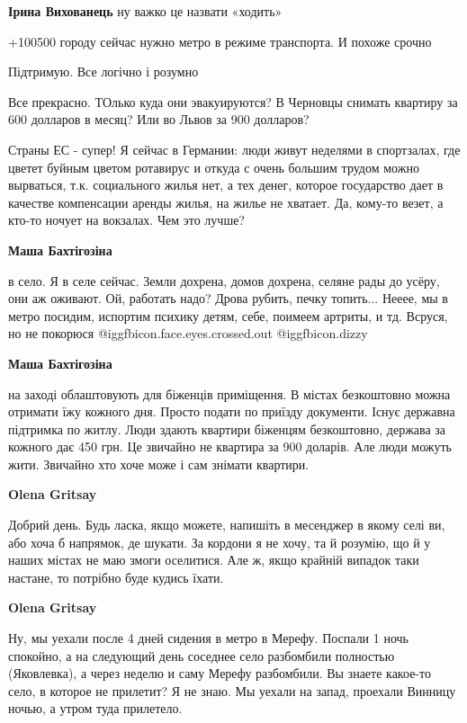 \begin{itemize}
\begin{itemize}
\textbf{Ірина Вихованець} ну важко це назвати «ходить»
\end{itemize} %

+100500 городу сейчас нужно метро в режиме транспорта. И похоже срочно

Підтримую. Все логічно і розумно


Все прекрасно. ТОлько куда они эвакуируются? В Черновцы снимать квартиру за 600
долларов в месяц? Или во Львов за 900 долларов?

Страны ЕС - супер! Я сейчас в Германии: люди живут неделями в спортзалах, где
цветет буйным цветом ротавирус и откуда с очень большим трудом можно вырваться,
т.к. социального жилья нет, а тех денег, которое государство дает в качестве
компенсации аренды жилья, на жилье не хватает. Да, кому-то везет, а кто-то
ночует на вокзалах. Чем это лучше?

\begin{itemize} %
\textbf{Маша Бахтігозіна} 

в село. Я в селе сейчас. Земли дохрена, домов дохрена, селяне рады до усёру,
они аж оживают. Ой, работать надо? Дрова рубить, печку топить... Нееее, мы в
метро посидим, испортим психику детям, себе, поимеем артриты, и тд. Всруся, но
не покорюся @igg{fbicon.face.eyes.crossed.out}  @igg{fbicon.dizzy} 

\textbf{Маша Бахтігозіна} 

на заході облаштовують для біженців приміщення. В містах безкоштовно можна
отримати їжу кожного дня. Просто подати по приїзду документи. Існує державна
підтримка по житлу. Люди здають квартири біженцям безкоштовно, держава за
кожного дає 450 грн. Це звичайно не квартира за 900 доларів. Але люди можуть
жити. Звичайно хто хоче може і сам знімати квартири.

\textbf{Olena Gritsay} 

Добрий день. Будь ласка, якщо можете, напишіть в месенджер в якому селі ви, або
хоча б напрямок, де шукати. За кордони я не хочу, та й розумію, що й у наших
містах не маю змоги оселитися. Але ж, якщо крайній випадок таки настане, то
потрібно буде кудись їхати.

\textbf{Olena Gritsay} 

Ну, мы уехали после 4 дней сидения в метро в Мерефу. Поспали 1 ночь спокойно, а
на следующий день соседнее село разбомбили полностью (Яковлевка), а через
неделю и саму Мерефу разбомбили. Вы знаете какое-то село, в которое не
прилетит? Я не знаю. Мы уехали на запад, проехали Винницу ночью, а утром туда
прилетело.


\end{itemize}
\end{itemize}
